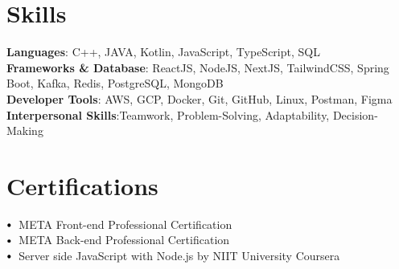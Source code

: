\documentclass[letterpaper,11pt]{article}
\newcommand\sbullet[1][.5]{\mathbin{\vcenter{\hbox{\scalebox{#1}{$\bullet$}}}}}
\begin{document}
\section{Skills}
 \begin{itemize}[leftmargin=0.15in, label={}]
    \small{\item{
     \textbf{Languages}{: C++, JAVA, Kotlin, JavaScript, TypeScript, SQL} \\
     \vspace{2pt}
     \textbf{Frameworks \& Database}{: ReactJS, NodeJS, NextJS, TailwindCSS, Spring Boot, Kafka, Redis, PostgreSQL, MongoDB} \\
     \vspace{2pt}
     \textbf{Developer Tools}{: AWS, GCP, Docker, Git, GitHub, Linux, Postman, Figma} \\
     \vspace{2pt}
     \textbf{Interpersonal Skills}{:Teamwork, Problem-Solving, Adaptability, Decision-Making} \\
    }}
 \end{itemize}
 \vspace{-14pt}

\section{Certifications}

$\sbullet[.75] \hspace{0.1cm}$ 
{{META Front-end Professional Certification}} {\href{https://coursera.org/share/0a950a3994e4aa550d83de3a782688bc}{\raisebox{-0.1\height}\faExternalLink }}
\hspace{2cm}\\

$\sbullet[.75] \hspace{0.1cm}$ 
{{META Back-end  Professional Certification}} {\href{https://coursera.org/share/f0c890d8a5227e31c6542d93b11cdc7b}{\raisebox{-0.1\height}\faExternalLink }}
\hspace{2cm}\\

$\sbullet[.75] \hspace{0.1cm}$ 
{{Server side JavaScript with Node.js by NIIT University Coursera}} 
{\href{https://coursera.org/share/96ca45ce071f58aa4d48d638a4de519a}{\raisebox{-0.1\height}\faExternalLink }}
\hspace{8cm}\\
\end{document}
